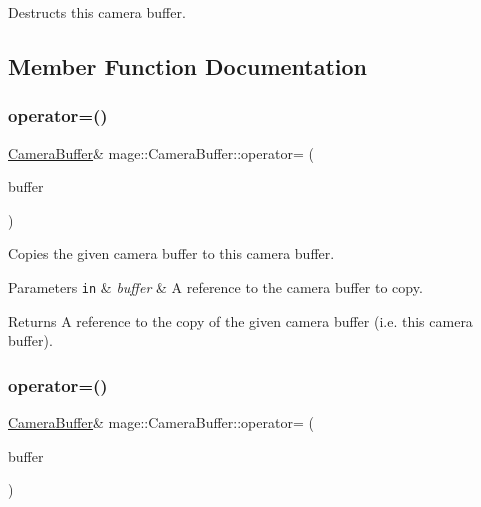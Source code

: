 Destructs this camera buffer. 

\subsection{Member Function Documentation}
\hypertarget{structmage_1_1_camera_buffer_a4c2f048e1c441ae147455722d9cd4af7}{}\label{structmage_1_1_camera_buffer_a4c2f048e1c441ae147455722d9cd4af7} 
\subsubsection{\texorpdfstring{operator=()}{operator=()}\hspace{0.1cm}{\footnotesize\ttfamily [1/2]}}
{\footnotesize\ttfamily \hyperlink{structmage_1_1_camera_buffer}{Camera\+Buffer}\& mage\+::\+Camera\+Buffer\+::operator= (\begin{DoxyParamCaption}\item[{const \hyperlink{structmage_1_1_camera_buffer}{Camera\+Buffer} \&}]{buffer }\end{DoxyParamCaption})\hspace{0.3cm}{\ttfamily [default]}}

Copies the given camera buffer to this camera buffer.


\begin{DoxyParams}[1]{Parameters}
\mbox{\tt in}  & {\em buffer} & A reference to the camera buffer to copy. \\
\hline
\end{DoxyParams}
\begin{DoxyReturn}{Returns}
A reference to the copy of the given camera buffer (i.\+e. this camera buffer). 
\end{DoxyReturn}
\hypertarget{structmage_1_1_camera_buffer_a901081932ab76c9bdfacb0814e821190}{}\label{structmage_1_1_camera_buffer_a901081932ab76c9bdfacb0814e821190} 
\subsubsection{\texorpdfstring{operator=()}{operator=()}\hspace{0.1cm}{\footnotesize\ttfamily [2/2]}}
{\footnotesize\ttfamily \hyperlink{structmage_1_1_camera_buffer}{Camera\+Buffer}\& mage\+::\+Camera\+Buffer\+::operator= (\begin{DoxyParamCaption}\item[{\hyperlink{structmage_1_1_camera_buffer}{Camera\+Buffer} \&\&}]{buffer }\end{DoxyParamCaption})\hspace{0.3cm}{\ttfamily [default]}}


